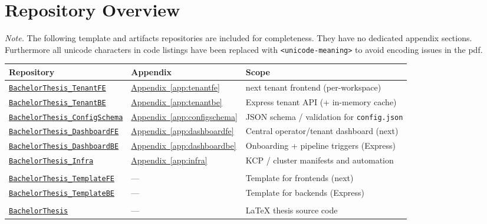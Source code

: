 \documentclass[11pt, a4paper, oneside, listof=totoc]{scrartcl}
\newcommand{\ghowner}{MysterionAutotronic}
\newcommand{\ghrepo}[1]{%
    \href{https://github.com/\ghowner/#1}{\nolinkurl{#1}}%
}
\DeclareRobustCommand{\appref}[1]{\hyperref[#1]{Appendix~\ref*{#1}}}
\begin{document}
        \section{Repository Overview}\label{app:repos-overview}
            \noindent\emph{Note.} The following template and artifacts repositories are included for
            completeness.
            They have no dedicated appendix sections. \\
            Furthermore all unicode characters in code listings have been replaced with
            \texttt{<unicode-meaning>} to avoid encoding issues in the \gls{pdf}.
            \\
            \begin{longtable}{@{}l l P{7.5cm}@{}}
                \toprule
                Repository & Appendix & Scope \\
                \midrule
                \ghrepo{BachelorThesis_TenantFE}     & \appref{app:tenantfe}     & \gls{next} tenant frontend (per-workspace) \\
                \ghrepo{BachelorThesis_TenantBE}     & \appref{app:tenantbe}     & Express tenant API (+ in-memory cache) \\
                \ghrepo{BachelorThesis_ConfigSchema} & \appref{app:configschema} & JSON schema / validation for \texttt{config.json} \\
                \ghrepo{BachelorThesis_DashboardFE}  & \appref{app:dashboardfe}  & Central operator/tenant dashboard (\gls{next}) \\
                \ghrepo{BachelorThesis_DashboardBE}  & \appref{app:dashboardbe}  & Onboarding + pipeline triggers (Express) \\
                \ghrepo{BachelorThesis_Infra}        & \appref{app:infra}        & KCP / cluster manifests and automation \\
                \addlinespace
                \\
                \ghrepo{BachelorThesis_TemplateFE}   & —                         & Template for frontends (\gls{next}) \\
                \ghrepo{BachelorThesis_TemplateBE}   & —                         & Template for backends (Express) \\
                \addlinespace
                \\
                \ghrepo{BachelorThesis}              & —                         & \LaTeX{} thesis source code \\
                \bottomrule
            \end{longtable}
\end{document}

